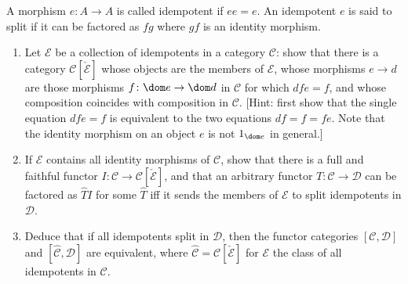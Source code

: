 A morphism $e\colon A\to A$ is called idempotent if $ee = e$. An idempotent
$e$ is said to split if it can be factored as $fg$ where $gf$ is an identity
morphism.

\begin{enumerate}[label=(\roman*)]
	\item Let $\mathcal{E}$ be a collection of idempotents in a category $\mathcal{C}$:
		show that there is a category $\mathcal{C}[\check{\mathcal{E}}]$ whose objects
		are the members of $\mathcal{E}$, whose morphisms $e \to d$ are those morphisms
		$f\colon \dom e\to \dom d$ in $\mathcal{C}$ for which $dfe = f$, and whose
		composition coincides with composition in $\mathcal{C}$. [Hint: first show that
		the single equation $dfe = f$ is equivalent to the two equations $df = f = fe$.
		Note that the identity morphism on an object $e$ is not $1_{\dom e}$ in general.]

	\item If $\mathcal{E}$ contains all identity morphisms of $\mathcal{C}$, show that there
		is a full and faithful functor $I\colon \mathcal{C} \to \mathcal{C}[\check{\mathcal{E}}]$,
		and that an arbitrary functor $T\colon \mathcal{C}\to \mathcal{D}$ can be factored
		as $\widehat{T}I$ for some $\widehat{T}$ iff it sends the members of $\mathcal{E}$ to split
		idempotents in $\mathcal{D}$.

	\item Deduce that if all idempotents split in $\mathcal{D}$, then the functor categories
		$[\mathcal{C}, \mathcal{D}]$ and $[\widehat{\mathcal{C}}, \mathcal{D}]$ are equivalent,
		where $\widehat{\mathcal{C}}=\mathcal{C}[\check{\mathcal{E}}]$ for $\mathcal{E}$ the class
		of all idempotents in $\mathcal{C}$.
\end{enumerate}
